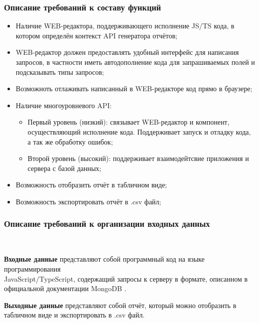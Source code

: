 \documentclass[12pt]{article}
\begin{document}
    \subsubsection{Описание требований к составу функций}
    \begin{itemize}
        \item Наличие WEB-редактора, поддерживающего исполнение JS/TS кода, в котором определён контекст API генератора отчётов;
        \item WEB-редактор должен предоставлять удобный интерфейс для написания запросов, в частности иметь автодополнение кода для
        запрашиваемых полей и подсказывать типы запросов;
        \item Возможноть отлаживать написанный в WEB-редакторе код прямо в браузере;
        \item Наличие многоуровневого API:
        \begin{itemize}
            \item Первый уровень (низкий): связывает WEB-редактор и компонент, осуществляющий исполнение кода. Поддерживает запуск и отладку кода,
            а так же обработку ошибок;
            \item Второй уровень (высокий): поддерживает взаимодейтсвие приложения и сервера с базой данных;
        \end{itemize}
        \item Возможность отобразить отчёт в табличном виде;
        \item Возможность экспортировать отчёт в .csv файл;
    \end{itemize}

    \subsubsection{Описание требований к организации входных данных}~

    \textbf{Входные данные} представляют собой программный код на языке программирования\\
    JavaScript/TypeScript, содержащий запросы
    к серверу в формате, описанном в официальной документации MongoDB \cite{QueryDoc}.

    \textbf{Выходные данные} представляют собой отчёт, который можно отобразить в табличном виде и экспортировать в .csv файл.
\end{document}
